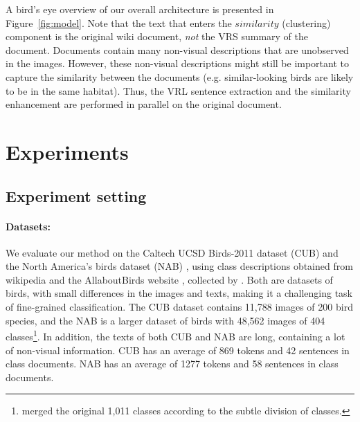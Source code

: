 \documentclass[11pt,a4paper]{article}
\newcommand\reut[1]{\textcolor{green}{\textbf{REUT:} #1 }}
\begin{document}
A bird's eye 
overview of our overall architecture is presented in Figure~\ref{fig:model}.
Note that the text that enters the $similarity$  (clustering) component is the original wiki document, {\em not} the VRS summary of the document. Documents contain many non-visual descriptions that are unobserved in the images. However, these non-visual descriptions might still be important to capture the similarity between the documents (e.g. similar-looking birds are likely to be in the same habitat). Thus, the VRL sentence extraction and the similarity enhancement are performed in parallel on the original document. 
\section{Experiments}

\subsection{Experiment setting}

\paragraph{Datasets:}  We evaluate our method on the Caltech UCSD Birds-2011 dataset (CUB) \citet{wah2011caltech} and the North America’s birds dataset (NAB) \cite{van2015building}, using class descriptions obtained from wikipedia and the AllaboutBirds website \cite{AllaboutBirds}, collected by \citet{elhoseiny2017link}. 
Both are datasets of birds, with small differences in the images and texts, making it a challenging task of fine-grained classification. The CUB dataset contains 11,788 images of 200 bird species, and the NAB
is a larger dataset of birds with 48,562 images of 404 classes\footnote{\citet{elhoseiny2017link} merged the original 1,011 classes according to the subtle division of classes.}.
In addition, the texts of both CUB and NAB are long, containing a lot of non-visual information. CUB has an average of 869 tokens and 42 sentences in class documents. NAB has an average of 1277 tokens and 58 sentences in class documents. 
\end{document}
